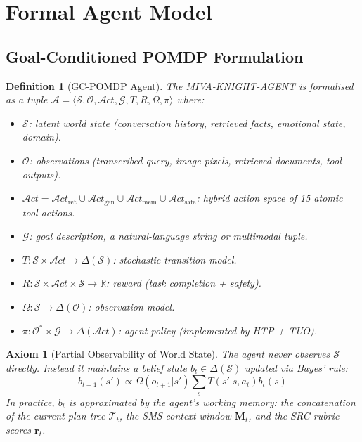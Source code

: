 \documentclass[10pt,conference]{IEEEtran}
\theoremstyle{ieeethm}
\theoremstyle{ieeedef}
\newtheorem{definition}[theorem]{Definition}
\newtheorem{axiom}{Axiom}
\theoremstyle{ieeeremark}
\begin{document}
\section{Formal Agent Model}
\label{sec:agent_model}

\subsection{Goal-Conditioned POMDP Formulation}

\begin{definition}[GC-POMDP Agent]
\label{def:gcpomdp}
The \textsc{MIVA-KNIGHT-AGENT} is formalised as a tuple $\mathcal{A} = \langle \mathcal{S}, \mathcal{O}, \mathcal{A}ct, \mathcal{G}, T, R, \Omega, \pi \rangle$ where:
\begin{itemize}[nosep]
  \item $\mathcal{S}$: latent world state (conversation history, retrieved facts, emotional state, domain).
  \item $\mathcal{O}$: observations (transcribed query, image pixels, retrieved documents, tool outputs).
  \item $\mathcal{A}ct = \mathcal{A}ct_\text{ret} \cup \mathcal{A}ct_\text{gen} \cup \mathcal{A}ct_\text{mem} \cup \mathcal{A}ct_\text{safe}$: hybrid action space of 15 atomic tool actions.
  \item $\mathcal{G}$: goal description, a natural-language string or multimodal tuple.
  \item $T: \mathcal{S} \times \mathcal{A}ct \to \Delta(\mathcal{S})$: stochastic transition model.
  \item $R: \mathcal{S} \times \mathcal{A}ct \times \mathcal{S} \to \mathbb{R}$: reward (task completion + safety).
  \item $\Omega: \mathcal{S} \to \Delta(\mathcal{O})$: observation model.
  \item $\pi: \mathcal{O}^* \times \mathcal{G} \to \Delta(\mathcal{A}ct)$: agent policy (implemented by HTP + TUO).
\end{itemize}
\end{definition}

\begin{axiom}[Partial Observability of World State]
\label{ax:partial_obs}
The agent never observes $\mathcal{S}$ directly. Instead it maintains a belief state $b_t \in \Delta(\mathcal{S})$ updated via Bayes' rule:
\begin{equation}
b_{t+1}(s') \propto \Omega(o_{t+1}|s') \sum_{s} T(s'|s,a_t) b_t(s)
\label{eq:belief_update}
\end{equation}
In practice, $b_t$ is approximated by the agent's working memory: the concatenation of the current plan tree $\mathcal{T}_t$, the SMS context window $\mathbf{M}_t$, and the SRC rubric scores $\mathbf{r}_t$.
\end{axiom}
\end{document}
